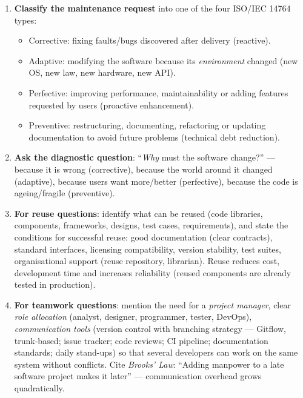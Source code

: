 \documentclass[11pt]{article}
\newcommand{\cle}[1]{{\popxbold\color{popdark}#1}}
\begin{document}
\begin{methode}
\begin{enumerate}
\item \textbf{Classify the maintenance request} into one of the four ISO/IEC 14764 types:
\begin{itemize}
\item \cle{Corrective}: fixing faults/bugs discovered after delivery (reactive).
\item \cle{Adaptive}: modifying the software because its \emph{environment} changed (new OS, new law, new hardware, new API).
\item \cle{Perfective}: improving performance, maintainability or adding features requested by users (proactive enhancement).
\item \cle{Preventive}: restructuring, documenting, refactoring or updating documentation to avoid future problems (technical debt reduction).
\end{itemize}
\item \textbf{Ask the diagnostic question}: ``\emph{Why} must the software change?'' — because it is wrong (corrective), because the world around it changed (adaptive), because users want more/better (perfective), because the code is ageing/fragile (preventive).
\item \textbf{For reuse questions}: identify what can be reused (code libraries, components, frameworks, designs, test cases, requirements), and state the conditions for successful reuse: good documentation (clear contracts), standard interfaces, licensing compatibility, version stability, test suites, organisational support (reuse repository, librarian). Reuse reduces cost, development time and increases reliability (reused components are already tested in production).
\item \textbf{For teamwork questions}: mention the need for a \emph{project manager}, clear \emph{role allocation} (analyst, designer, programmer, tester, DevOps), \emph{communication tools} (version control with branching strategy — Gitflow, trunk-based; issue tracker; code reviews; CI pipeline; documentation standards; daily stand-ups) so that several developers can work on the same system without conflicts. Cite \emph{Brooks' Law}: ``Adding manpower to a late software project makes it later'' — communication overhead grows quadratically.
\end{enumerate}
\end{methode}
\end{document}
